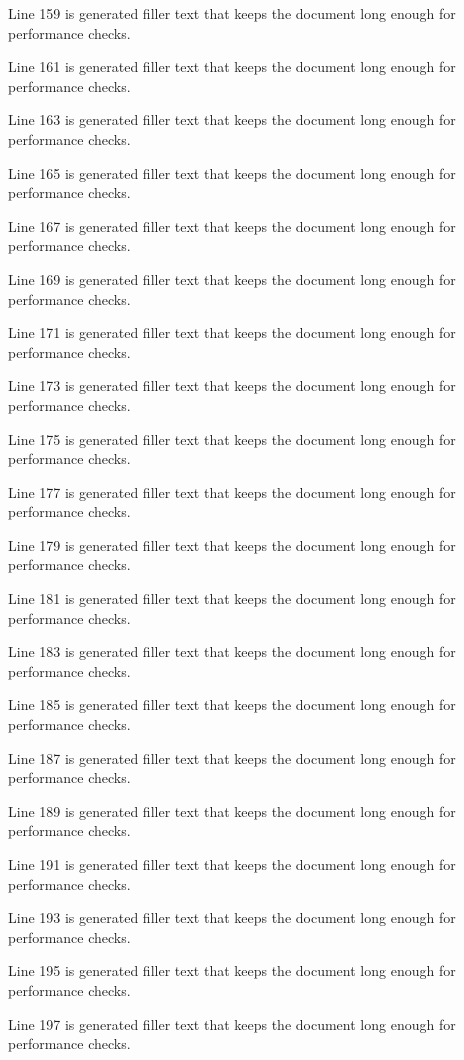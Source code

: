 Line 159 is generated filler text that keeps the document long enough for performance checks.

Line 161 is generated filler text that keeps the document long enough for performance checks.

Line 163 is generated filler text that keeps the document long enough for performance checks.

Line 165 is generated filler text that keeps the document long enough for performance checks.

Line 167 is generated filler text that keeps the document long enough for performance checks.

Line 169 is generated filler text that keeps the document long enough for performance checks.

Line 171 is generated filler text that keeps the document long enough for performance checks.

Line 173 is generated filler text that keeps the document long enough for performance checks.

Line 175 is generated filler text that keeps the document long enough for performance checks.

Line 177 is generated filler text that keeps the document long enough for performance checks.

Line 179 is generated filler text that keeps the document long enough for performance checks.

Line 181 is generated filler text that keeps the document long enough for performance checks.

Line 183 is generated filler text that keeps the document long enough for performance checks.

Line 185 is generated filler text that keeps the document long enough for performance checks.

Line 187 is generated filler text that keeps the document long enough for performance checks.

Line 189 is generated filler text that keeps the document long enough for performance checks.

Line 191 is generated filler text that keeps the document long enough for performance checks.

Line 193 is generated filler text that keeps the document long enough for performance checks.

Line 195 is generated filler text that keeps the document long enough for performance checks.

Line 197 is generated filler text that keeps the document long enough for performance checks.

